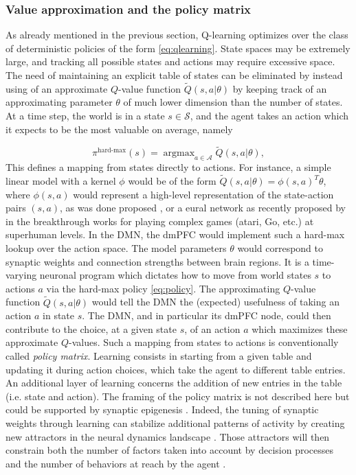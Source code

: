 \documentclass[10pt,letterpaper]{article}
\DeclareMathOperator{\argmax}{argmax}
\newcommand{\suggestadd}[1]{{\color{blue} #1}}
\begin{document}
\subsubsection{Value approximation and the policy matrix}
As already mentioned in the previous section, Q-learning optimizes over the class of
deterministic policies of the form \eqref{eq:qlearning}. State spaces may be extremely large,
and tracking all possible states and actions may require excessive space.
The need of maintaining an explicit table of
states can be eliminated by instead using of an approximate $Q$-value function $\tilde{Q}(s,a|\theta)$
by keeping track of an approximating parameter $\theta$ of much lower dimension than the number of states.
At a time step, the world is in a state $s \in \mathcal S$, and the agent takes an
action which it expects to be the most valuable on average, namely

\begin{equation}
  \pi^{\text{hard-max}}(s) = \argmax_{a \in \mathcal A}\tilde{Q}(s, a|\theta),
  \label{eq:policy}
\end{equation}
This defines a mapping from states directly to actions.
For instance, a simple linear model with a kernel $\phi$ would be of the
form $\tilde{Q}(s, a|\theta) = \phi(s,a)^T\theta$, where
$\phi(s,a)$ would represent a high-level representation of the state-action pairs
$(s,a)$, as was done proposed \citep{songNIPS2016}, or a eural network as recently proposed by in the
breakthrough works
\citep{mnih2015,silver2016mastering} for playing complex games (atari, Go, etc.) at superhuman levels.
In the DMN, the dmPFC would implement such a hard-max lookup
over the action space.
The model
  parameters $\theta$ would correspond to synaptic weights and connection strengths between
  brain regions. It is a time-varying neuronal program which dictates how to move from world states $s$ to actions $a$ via the hard-max policy \eqref{eq:policy}.
  The approximating $Q$-value function $\tilde{Q}(s, a|\theta)$ would tell the DMN the (expected) usefulness of taking an action $a$ in state $s$.
  The DMN, and in particular its dmPFC node, could then contribute to the choice, at a given state $s$, of an action $a$ which maximizes these approximate
  $Q$-values. Such a mapping from states to actions is conventionally called \textit{policy matrix}\citep{mnih2015,silver2016mastering}.
  Learning consists in starting from a given table and
  updating it during action choices,
  which take the agent to different table entries. \suggestadd{An additional layer of learning concerns the addition of new entries in the table (i.e. state and action). The framing of the policy matrix is not described here but could be supported by synaptic epigenesis \citep{gisiger_acquisition_2005}. Indeed, the tuning of synaptic weights through learning can stabilize additional patterns of activity by
creating new attractors in the neural dynamics landscape \citep{takeuchi_synaptic_2014}. Those attractors will then constrain both
the number of factors taken into account by decision processes and the number of behaviors at reach by the agent \citep{wang_decision_2008}.}
\end{document}
